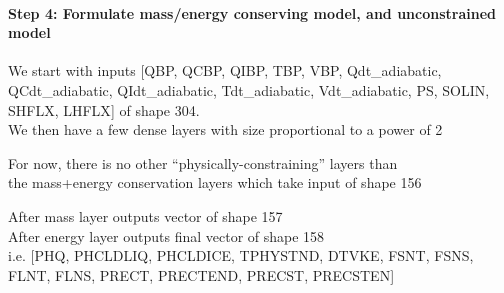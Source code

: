\documentclass[11pt]{article}
\begin{document}
    \hypertarget{step-4-formulate-massenergy-conserving-model-and-unconstrained-model}{%
\paragraph{Step 4: Formulate mass/energy conserving model, and
unconstrained
model}\label{step-4-formulate-massenergy-conserving-model-and-unconstrained-model}}

We start with inputs {[}QBP, QCBP, QIBP, TBP, VBP, Qdt\_adiabatic,
QCdt\_adiabatic, QIdt\_adiabatic, Tdt\_adiabatic, Vdt\_adiabatic, PS,
SOLIN, SHFLX, LHFLX{]} of shape 304.\\
We then have a few dense layers with size proportional to a power of 2

For now, there is no other ``physically-constraining'' layers than\\
the mass+energy conservation layers which take input of shape 156

After mass layer outputs vector of shape 157\\
After energy layer outputs final vector of shape 158\\
i.e. {[}PHQ, PHCLDLIQ, PHCLDICE, TPHYSTND, DTVKE, FSNT, FSNS, FLNT,
FLNS, PRECT, PRECTEND, PRECST, PRECSTEN{]}
\end{document}
